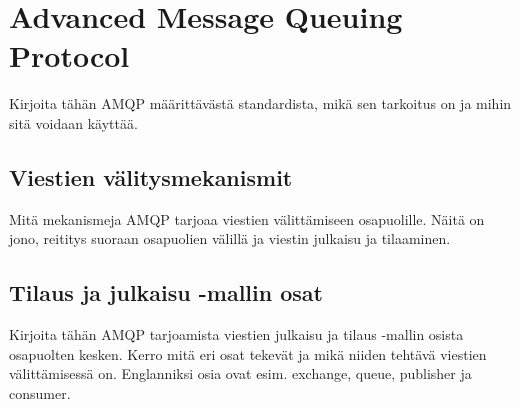 \section{Advanced Message Queuing Protocol}
\begin{it}
	Kirjoita tähän AMQP määrittävästä standardista, mikä sen tarkoitus on ja mihin sitä voidaan käyttää.
\end{it}


\subsection{Viestien välitysmekanismit}
\begin{it}
	Mitä mekanismeja AMQP tarjoaa viestien välittämiseen osapuolille. Näitä on jono, reititys suoraan osapuolien välillä ja viestin julkaisu ja tilaaminen.
\end{it}


\subsection{Tilaus ja julkaisu -mallin osat}
\begin{it}
	Kirjoita tähän AMQP tarjoamista viestien julkaisu ja tilaus -mallin osista osapuolten kesken. Kerro mitä eri osat tekevät ja mikä niiden tehtävä viestien välittämisessä on. Englanniksi osia ovat esim. exchange, queue, publisher ja consumer.
\end{it}